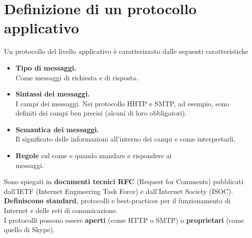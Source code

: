 \section{Definizione di un protocollo applicativo}
Un protocollo del livello applicativo è caratterizzato dalle seguenti caratteristiche
\begin{itemize}
    \item \textbf{Tipo di messaggi.}\\
    Come messaggi di richiesta e di risposta.
    \item \textbf{Sintassi dei messaggi.}\\
    I campi dei messaggi. Nei protocollo HHTP e SMTP, ad esempio, sono definiti dei campi ben precisi (alcuni di loro obbligatori).
    \item \textbf{Semantica dei messaggi.}\\
    Il significato delle informazioni all'interno dei campi e come interpretarli.
    \item \textbf{Regole} sul come e quando mandare e rispondere ai \\messaggi.
\end{itemize}
 Sono spiegati in \textbf{documenti tecnici RFC} (Request for Comments) pubblicati dall'IETF (Internet Engineering Task Force) e dall'Internet Society (ISOC). \textbf{Definiscono standard}, protocolli e best-practices per il funzionamento di Internet e delle reti di comunicazione.\\
 I protocolli possono essere \textbf{aperti} (come HTTP o SMTP) o \textbf{proprietari} (come quello di Skype).


\newpage


